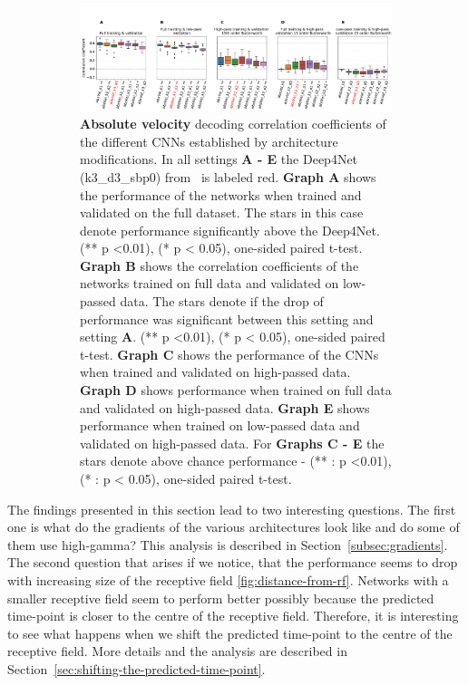 \begin{itemize}
\begin{figure}[!htpb]
\begin{subfigure}[b]{\textwidth}
   \includegraphics[width=1\linewidth]{img/ch4/original_setting_absVel_performance_comparison}
   \caption{\textbf{Absolute velocity} decoding correlation coefficients of the different CNNs established by architecture modifications. In all settings \textbf{
   A - E} the Deep4Net (k3\_d3\_sbp0) from~\cite{Hammer-2021} is labeled red. \textbf{Graph A} shows the performance of the networks when trained and validated on the full dataset. The stars in this case denote performance significantly above the Deep4Net. (** p <0.01), (* p < 0.05), one-sided paired t-test.
   \textbf{Graph B} shows the correlation coefficients of the networks trained on full data and validated on low-passed data. 
   The stars denote if the drop of performance was significant between this setting and setting \textbf{A}. (** p <0.01), (* p < 0.05), one-sided paired t-test.
   \textbf{Graph C} shows the performance of the CNNs when trained and validated on high-passed data. \textbf{Graph D} shows performance when trained on full data and validated on high-passed data. \textbf{Graph E} shows performance when trained on low-passed data and validated on high-passed data. For \textbf{Graphs C - E} the stars denote above chance performance - (** : p <0.01), (* : p < 0.05), one-sided paired t-test.}
   \label{fig:original-performances-absolute-velocity}
\end{subfigure}
\caption[]{}
\end{figure}\label{fig:original-performances}


\end{itemize}

The findings presented in this section lead to two interesting questions.
The first one  is what do the gradients of the various architectures look like and do some of them use high-gamma?
This analysis is described in Section~\ref{subsec:gradients}.
The second question that arises if we notice, that the performance seems to drop with increasing size of the receptive field \cref{fig:distance-from-rf}.
Networks with a smaller receptive field seem to perform better possibly because the predicted time-point is closer to the centre of the receptive field.
Therefore, it is interesting to see what happens when we shift the predicted time-point to the centre of the receptive field.
More details and the analysis are described in Section~\ref{sec:shifting-the-predicted-time-point}.

